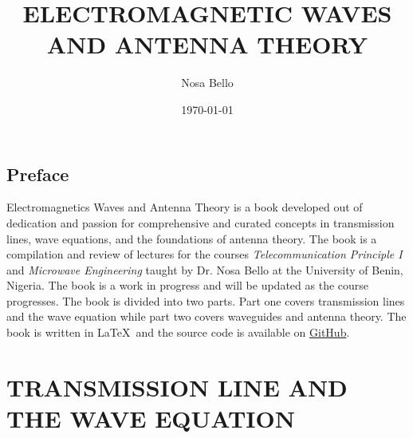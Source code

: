 \documentclass[a4paper,10pt, twocolumn]{book}
\begin{document}
\author{Nosa Bello}
\title{\color{blue}ELECTROMAGNETIC WAVES AND ANTENNA THEORY}
\date{\today}

\frontmatter
\maketitle
\tableofcontents

\chapter{Preface}
Electromagnetics Waves and Antenna Theory is a book developed out of dedication and passion for comprehensive and curated concepts in transmission lines, wave equations, and the foundations of antenna theory. The book is a compilation and review of lectures for the courses \textit{Telecommunication Principle I} and \textit{Microwave Engineering} taught by Dr. Nosa Bello at the University of Benin, Nigeria. The book is a work in progress and will be updated as the course progresses. The book is divided into two parts. Part one covers transmission lines and the wave equation while part two covers waveguides and antenna theory. The book is written in \LaTeX\ and the source code is available on \href{https://github.com/allisonoge/electromagnetism-and-antenna-theory-v2.git}{GitHub}.

\mainmatter

\part{TRANSMISSION LINE AND THE WAVE EQUATION}
















\end{document}
